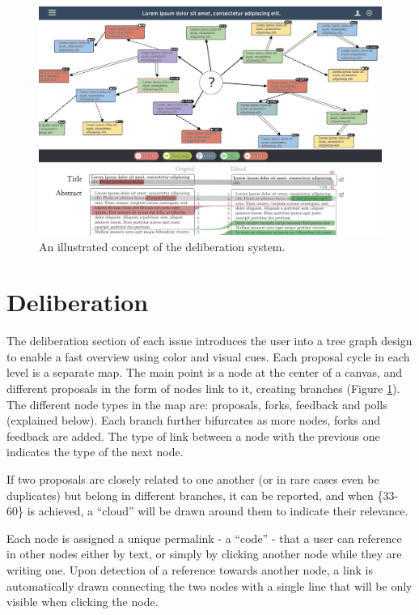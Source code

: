 \documentclass[a4paper,11pt]{article}
\begin{document}
\begin{multicols}{2}
\begin{figure}[th]
 \centering
 \includegraphics[width=140mm]{FigureB.jpg}
 \caption{An illustrated concept of the deliberation system.}
 \label{figure2}
\end{figure}

\section{Deliberation} \label{deliberation}

The deliberation section of each issue introduces the user into a tree graph design to enable a fast overview using color and visual cues. Each proposal cycle in each level is a separate map. The main point is a node at the center of a canvas, and different proposals in the form of nodes link to it, creating branches (Figure \ref{figure2}). The different node types in the map are: proposals, forks, feedback and polls (explained below). Each branch further bifurcates as more nodes, forks and feedback are added. The type of link between a node with the previous one indicates the type of the next node.

If two proposals are closely related to one another (or in rare cases even be duplicates) but belong in different branches, it can be reported, and when \{33-60\} is achieved, a “cloud” will be drawn around them to indicate their relevance.

Each node is assigned a unique permalink - a “code” - that a user can reference in other nodes either by text, or simply by clicking another node while they are writing one. Upon detection of a reference towards another node, a link is automatically drawn connecting the two nodes with a single line that will be only visible when clicking the node.


\end{multicols}
\end{document}
